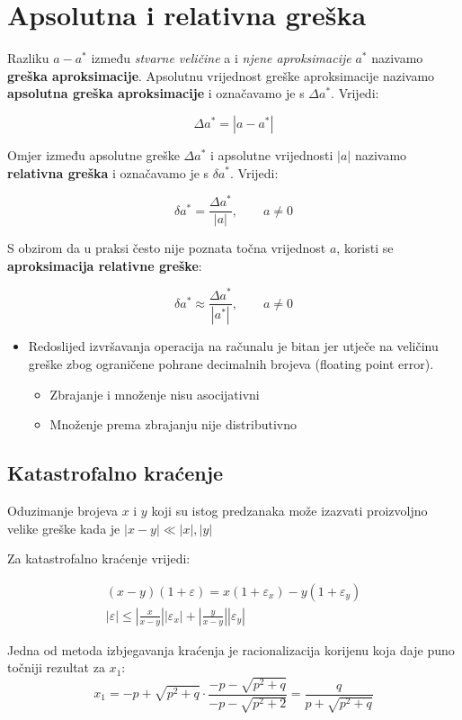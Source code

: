 \section{Apsolutna i relativna greška}

Razliku $a-a^*$ između \textit{stvarne veličine} a i \textit{njene aproksimacije} $a^*$ nazivamo \textbf{greška aproksimacije}. Apsolutnu vrijednost greške aproksimacije nazivamo \textbf{apsolutna greška aproksimacije} i označavamo je s $\Delta a^*$. Vrijedi:

$$
\Delta a^* = |a-a^*|
$$

Omjer između apsolutne greške $\Delta a^*$ i apsolutne vrijednosti $|a|$ nazivamo \textbf{relativna greška} i označavamo je s $\delta a^*$. Vrijedi:

$$
\delta a^* = \frac{\Delta a^*}{|a|},\qquad a\neq0
$$

S obzirom da u praksi često nije poznata točna vrijednost $a$, koristi se \textbf{aproksimacija relativne greške}:

$$
\delta a^* \approx \frac{\Delta a^*}{|a^*|},\qquad a\neq0
$$

\begin{itemize}
    \item Redoslijed izvršavanja operacija na računalu je bitan jer utječe na veličinu greške zbog ograničene pohrane decimalnih brojeva (floating point error).
    \begin{itemize}
        \item Zbrajanje i množenje nisu asocijativni
        \item Množenje prema zbrajanju nije distributivno
    \end{itemize}
\end{itemize}

\subsection{Katastrofalno kraćenje}

Oduzimanje brojeva $x$ i $y$ koji su istog predzanaka može izazvati proizvoljno velike greške kada je $|x-y| \ll |x|,|y|$

Za katastrofalno kraćenje vrijedi:

\begin{gather*}
(x-y)(1+\varepsilon) = x(1+\varepsilon_x) - y(1+\varepsilon_y)\\
|\varepsilon| \leq \left|\frac{x}{x-y}\right| |\varepsilon_x| + \left|\frac{y}{x-y}\right| |\varepsilon_y|
\end{gather*}

Jedna od metoda izbjegavanja kraćenja je racionalizacija korijenu koja daje puno točniji rezultat za $x_1$:
$$
    x_1=-p+\sqrt{p^2+q}\cdot\frac{-p-\sqrt{p^2+q}}{-p-\sqrt{p^2+2}}=\frac{q}{p+\sqrt{p^2+q}}
$$
